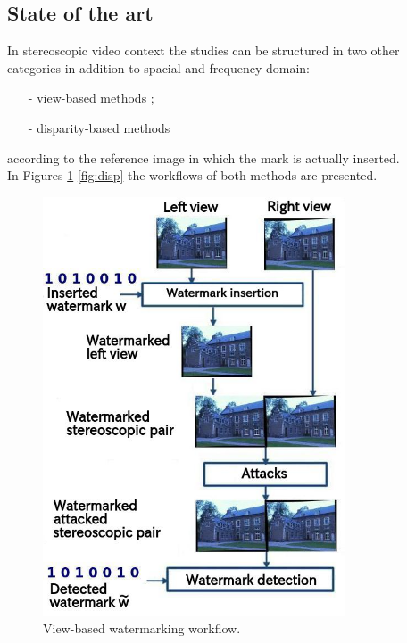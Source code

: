 \subsection{State of the art}
In stereoscopic video context the studies can be structured in two other categories in addition to spacial and frequency domain:
\begin{itemize}
\item[-] view-based methods \cite{16,17,18,19,20,21};
\item[-] disparity-based methods \cite{22}
\end{itemize}
according to the reference image in which the mark is actually inserted.\\
In Figures \ref{fig:view}-\ref{fig:disp} the workflows of both methods are presented.
\begin{figure}[h!]
\centering
\includegraphics[width=0.8\textwidth]{./img/views_domain.jpeg}
\caption{\small{View-based watermarking workflow.}}
\label{fig:view}
\end{figure}

